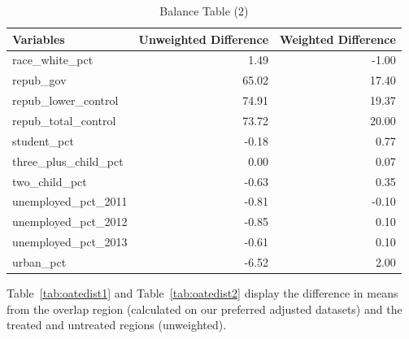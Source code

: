 \documentclass[12pt]{article}
\begin{document}
\begin{table}[ht]
\centering
\begin{tabular}{lrr}
  \toprule
Variables & Unweighted Difference & Weighted Difference \\ 
  \midrule
  race\_white\_pct & 1.49 & -1.00 \\ 
  repub\_gov & 65.02 & 17.40 \\ 
  repub\_lower\_control & 74.91 & 19.37 \\ 
  repub\_total\_control & 73.72 & 20.00 \\ 
  student\_pct & -0.18 & 0.77 \\ 
  three\_plus\_child\_pct & 0.00 & 0.07 \\ 
  two\_child\_pct & -0.63 & 0.35 \\ 
  unemployed\_pct\_2011 & -0.81 & -0.10 \\ 
  unemployed\_pct\_2012 & -0.85 & 0.10 \\ 
  unemployed\_pct\_2013 & -0.61 & 0.10 \\ 
  urban\_pct & -6.52 & 2.00 \\ 
   \bottomrule
    \end{tabular}
    \caption{Balance Table (2)}
    \label{tab:baltab2}
\end{table}

Table~\ref{tab:oatedist1} and Table~\ref{tab:oatedist2} display the difference in means from the overlap region (calculated on our preferred adjusted datasets) and the treated and untreated regions (unweighted). 
\end{document}
